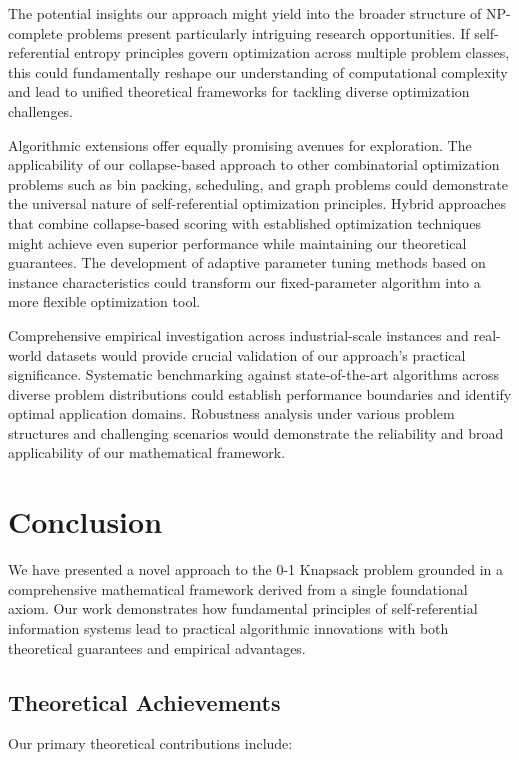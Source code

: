 \documentclass[11pt]{article}
\theoremstyle{remark}
\theoremstyle{definition}
\begin{document}
The potential insights our approach might yield into the broader structure of NP-complete problems present particularly intriguing research opportunities. If self-referential entropy principles govern optimization across multiple problem classes, this could fundamentally reshape our understanding of computational complexity and lead to unified theoretical frameworks for tackling diverse optimization challenges.

Algorithmic extensions offer equally promising avenues for exploration. The applicability of our collapse-based approach to other combinatorial optimization problems such as bin packing, scheduling, and graph problems could demonstrate the universal nature of self-referential optimization principles. Hybrid approaches that combine collapse-based scoring with established optimization techniques might achieve even superior performance while maintaining our theoretical guarantees. The development of adaptive parameter tuning methods based on instance characteristics could transform our fixed-parameter algorithm into a more flexible optimization tool.

Comprehensive empirical investigation across industrial-scale instances and real-world datasets would provide crucial validation of our approach's practical significance. Systematic benchmarking against state-of-the-art algorithms across diverse problem distributions could establish performance boundaries and identify optimal application domains. Robustness analysis under various problem structures and challenging scenarios would demonstrate the reliability and broad applicability of our mathematical framework.

\section{Conclusion}

We have presented a novel approach to the 0-1 Knapsack problem grounded in a comprehensive mathematical framework derived from a single foundational axiom. Our work demonstrates how fundamental principles of self-referential information systems lead to practical algorithmic innovations with both theoretical guarantees and empirical advantages.

\subsection{Theoretical Achievements}

Our primary theoretical contributions include:
\end{document}
